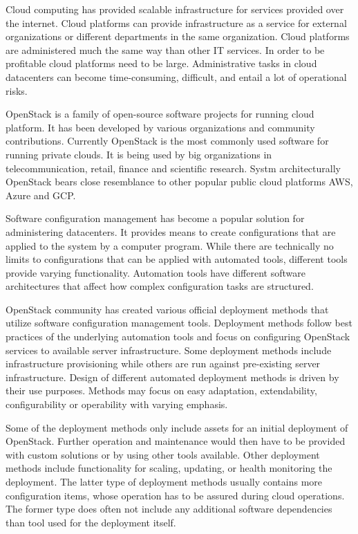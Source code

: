 Cloud computing has provided scalable infrastructure for services provided over
the internet. Cloud platforms can provide infrastructure as a service for
external organizations or different departments in the same organization. Cloud
platforms are administered much the same way than other IT services. In order
to be profitable cloud platforms need to be large. Administrative tasks in
cloud datacenters can become time-consuming, difficult, and entail a lot of
operational risks.

OpenStack is a family of open-source software projects for running cloud
platform. It has been developed by various organizations and community
contributions. Currently OpenStack is the most commonly used software for
running private clouds. It is being used by big organizations in
telecommunication, retail, finance and scientific research. Systm
architecturally OpenStack bears close resemblance to other popular public cloud
platforms AWS, Azure and GCP.

Software configuration management has become a popular solution for
administering datacenters. It provides means to create configurations that are
applied to the system by a computer program. While there are technically no
limits to configurations that can be applied with automated tools, different
tools provide varying functionality. Automation tools have different software
architectures that affect how complex configuration tasks are structured.

OpenStack community has created various official deployment methods that
utilize software configuration management tools. Deployment methods follow best
practices of the underlying automation tools and focus on configuring OpenStack
services to available server infrastructure. Some deployment methods include
infrastructure provisioning while others are run against pre-existing server
infrastructure. Design of different automated deployment methods is driven by
their use purposes. Methods may focus on easy adaptation, extendability,
configurability or operability with varying emphasis.

Some of the deployment methods only include assets for an initial deployment of
OpenStack. Further operation and maintenance would then have to be provided
with custom solutions or by using other tools available. Other deployment
methods include functionality for scaling, updating, or health monitoring the
deployment. The latter type of deployment methods usually contains more
configuration items, whose operation has to be assured during cloud operations.
The former type does often not include any additional software dependencies
than tool used for the deployment itself.

